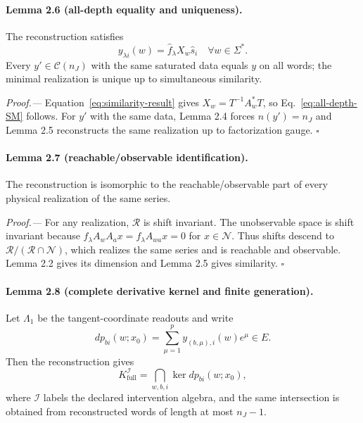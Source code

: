 \documentclass[aps,prl,onecolumn,superscriptaddress,nofootinbib]{revtex4-2}
\newcommand{\full}{\mathrm{full}}
\newcommand{\cN}{\mathcal N}
\newcommand{\cR}{\mathcal R}
\newcommand{\cC}{\mathcal C}
\begin{document}
\paragraph{Lemma 2.6 (all-depth equality and uniqueness).}
The reconstruction satisfies
\begin{equation}
 y_{\lambda i}(w)=\widehat f_\lambda X_w\widehat s_i
 \quad\forall w\in\Sigma^*.
 \label{eq:all-depth-SM}
\end{equation}
Every $y'\in\cC(n_J)$ with the same saturated data equals $y$ on all words; the minimal realization is unique up to simultaneous similarity.

\emph{Proof.---}
Equation~\eqref{eq:similarity-result} gives $X_w=T^{-1}A_w^*T$, so Eq.~\eqref{eq:all-depth-SM} follows.  For $y'$ with the same data, Lemma 2.4 forces $n(y')=n_J$ and Lemma 2.5 reconstructs the same realization up to factorization gauge. \hfill$\square$

\paragraph{Lemma 2.7 (reachable/observable identification).}
The reconstruction is isomorphic to the reachable/observable part of every physical realization of the same series.

\emph{Proof.---}
For any realization, $\cR$ is shift invariant.  The unobservable space is shift invariant because $f_\lambda A_wA_ax=f_\lambda A_{wa}x=0$ for $x\in\cN$.  Thus shifts descend to $\cR/(\cR\cap\cN)$, which realizes the same series and is reachable and observable.  Lemma 2.2 gives its dimension and Lemma 2.5 gives similarity. \hfill$\square$

\paragraph{Lemma 2.8 (complete derivative kernel and finite generation).}
Let $\Lambda_1$ be the tangent-coordinate readouts and write
\begin{equation}
 dp_{bi}(w;x_0)=\sum_{\mu=1}^p y_{(b,\mu),i}(w)e^\mu\in E.
 \label{eq:derivative-covector}
\end{equation}
Then the reconstruction gives
\begin{equation}
 K_{\full}^{\mathcal I}=\bigcap_{w,b,i}\ker dp_{bi}(w;x_0),
 \label{eq:full-kernel-SM}
\end{equation}
where $\mathcal I$ labels the declared intervention algebra, and the same intersection is obtained from reconstructed words of length at most $n_J-1$.
\end{document}
